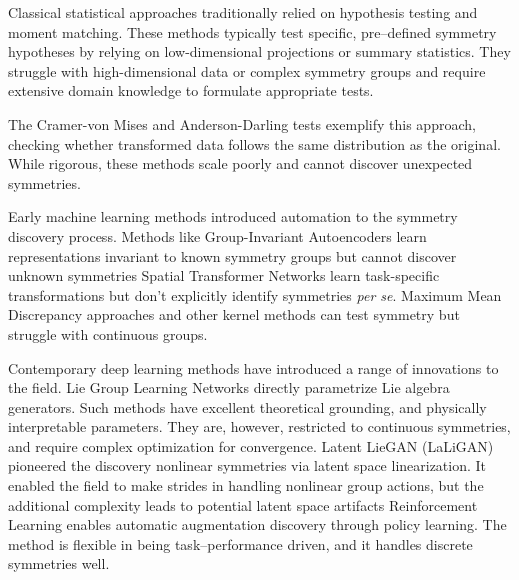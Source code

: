         Classical statistical approaches traditionally relied on hypothesis testing and moment matching.
        These methods typically test specific, pre--defined symmetry hypotheses by relying on low-dimensional projections or summary statistics.
        They struggle with high-dimensional data or complex symmetry groups and require extensive domain knowledge to formulate appropriate tests.

        The Cramer-von Mises and Anderson-Darling tests exemplify this approach, checking whether transformed data follows the same distribution as the original.
        While rigorous, these methods scale poorly and cannot discover unexpected symmetries.

        Early machine learning methods introduced automation to the symmetry discovery process.
        Methods like Group-Invariant Autoencoders learn representations invariant to known symmetry groups but cannot discover unknown symmetries
        Spatial Transformer Networks learn task-specific transformations but don't explicitly identify symmetries \textit{per se}.
        Maximum Mean Discrepancy approaches and other kernel methods can test symmetry but struggle with continuous groups.

        Contemporary deep learning methods have introduced a range of innovations to the field.
        Lie Group Learning Networks directly parametrize Lie algebra generators.
        Such methods have excellent theoretical grounding, and physically interpretable parameters.
        They are, however, restricted to continuous symmetries, and require complex optimization for convergence.
        Latent LieGAN (LaLiGAN) pioneered the discovery nonlinear symmetries via latent space linearization.
        It enabled the field to make strides in handling nonlinear group actions, but the additional complexity leads to potential latent space artifacts
        Reinforcement Learning enables automatic augmentation discovery through policy learning.
        The method is flexible in being task--performance driven, and it handles discrete symmetries well.

